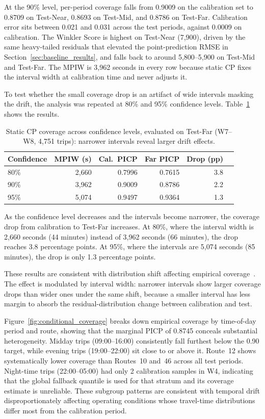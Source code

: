 \documentclass[12pt, a4paper, oneside]{report}
\begin{document}
At the 90\% level, per-period coverage falls from 0.9009 on the calibration set to 0.8709 on Test-Near, 0.8693 on Test-Mid, and 0.8786 on Test-Far. Calibration error sits between 0.021 and 0.031 across the test periods, against 0.0009 on calibration. The Winkler Score is highest on Test-Near (7,900), driven by the same heavy-tailed residuals that elevated the point-prediction RMSE in Section~\ref{sec:baseline_results}, and falls back to around 5,800--5,900 on Test-Mid and Test-Far. The MPIW is 3,962 seconds in every row because static CP fixes the interval width at calibration time and never adjusts it.

To test whether the small coverage drop is an artifact of wide intervals masking the drift, the analysis was repeated at 80\% and 95\% confidence levels. Table~\ref{tab:exp1_multiconf} shows the results.

\begin{table}[H]
\centering
\caption{Static CP coverage across confidence levels, evaluated on Test-Far (W7--W8, 4,751 trips): narrower intervals reveal larger drift effects.}
\label{tab:exp1_multiconf}
\begin{tabular}{lrrrrr}
\toprule
\textbf{Confidence} & \textbf{MPIW (s)} & \textbf{Cal.\ PICP} & \textbf{Far PICP} & \textbf{Drop (pp)} \\
\midrule
80\% & 2,660 & 0.7996 & 0.7615 & 3.8 \\
90\% & 3,962 & 0.9009 & 0.8786 & 2.2 \\
95\% & 5,074 & 0.9497 & 0.9364 & 1.3 \\
\bottomrule
\end{tabular}
\end{table}

As the confidence level decreases and the intervals become narrower, the coverage drop from calibration to Test-Far increases. At 80\%, where the interval width is 2,660 seconds (44 minutes) instead of 3,962 seconds (66 minutes), the drop reaches 3.8 percentage points. At 95\%, where the intervals are 5,074 seconds (85 minutes), the drop is only 1.3 percentage points.

These results are consistent with distribution shift affecting empirical coverage~\cite{Barber2023816}. The effect is modulated by interval width: narrower intervals show larger coverage drops than wider ones under the same shift, because a smaller interval has less margin to absorb the residual-distribution change between calibration and test.

Figure~\ref{fig:conditional_coverage} breaks down empirical coverage by time-of-day period and route, showing that the marginal PICP of 0.8745 conceals substantial heterogeneity. Midday trips (09:00--16:00) consistently fall furthest below the 0.90 target, while evening trips (19:00--22:00) sit close to or above it. Route~12 shows systematically lower coverage than Routes~10 and~46 across all test periods. Night-time trips (22:00--05:00) had only 2 calibration samples in W4, indicating that the global fallback quantile is used for that stratum and its coverage estimate is unreliable. These subgroup patterns are consistent with temporal drift disproportionately affecting operating conditions whose travel-time distributions differ most from the calibration period.
\end{document}
